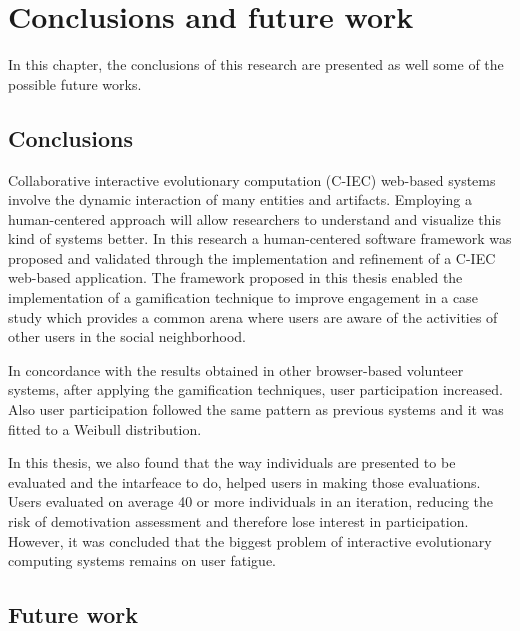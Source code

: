 \chapter{Conclusions and future work} \label{sec:5}

In this chapter, the conclusions of this research are presented as well some of
the possible future works.

\section{Conclusions}

Collaborative interactive evolutionary computation (C-IEC)
web-based systems involve the dynamic interaction of many entities and
artifacts. Employing a human-centered approach will allow researchers to
understand and visualize this kind of systems better. In this research a
human-centered software framework was proposed and validated through the
implementation and refinement of a C-IEC web-based application.
The framework proposed in this thesis enabled the implementation of
a gamification technique to improve engagement in
a case study which provides a common arena where users are aware of the
activities of other users in the social neighborhood.

In concordance with the results obtained in other browser-based volunteer
systems, after applying the gamification techniques, user participation
increased. Also user participation followed the same pattern as previous systems
and it was fitted to a Weibull distribution.

In this thesis, we also found that the way individuals are presented to be
evaluated and the intarfeace to do, helped users in making those evaluations.
Users evaluated on average 40 or more individuals in an iteration,
reducing the risk of demotivation assessment and
therefore lose interest in participation. However, it was concluded that the
biggest problem of interactive evolutionary computing systems remains on user
fatigue.


\section{Future work}


